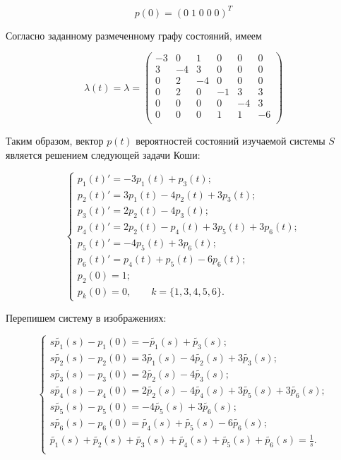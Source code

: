 \documentclass[14pt,a4paper]{scrartcl}
\begin{document}
\begin{equation}
	p(0) = (0 \; 1 \; 0 \; 0 \; 0)^T
\end{equation}

Согласно заданному размеченному графу состояний, имеем

\begin{equation*}
\lambda(t) = \lambda = 
\begin{pmatrix}
-3 & 0 & 1 & 0 & 0 & 0\\
3 & -4 & 3 & 0 & 0 & 0 \\
0 & 2 & -4 & 0 & 0 & 0 \\
0 & 2 & 0 & -1 & 3 & 3 \\
0 & 0 & 0 & 0 & -4 & 3 \\
0 & 0 & 0 & 1 & 1 & -6 \\
\end{pmatrix}
\end{equation*}


Таким образом, вектор $p(t)$ вероятностей состояний изучаемой системы $S$ является решением следующей задачи Коши:

\begin{equation*}
	\begin{cases}
		p_1(t)' = -3p_1(t) + p_3(t);\\
		p_2(t)' = 3p_1(t) - 4p_2(t) + 3p_3(t);\\
		p_3(t)' = 2p_2(t) - 4p_3(t);\\
		p_4(t)' = 2p_2(t) - p_4(t) + 3p_5(t) + 3p_6(t);\\
		p_5(t)' = - 4p_5(t)+ 3p_6(t);\\
		p_6(t)' = p_4(t) + p_5(t) - 6p_6(t);\\
		
		p_2(0) = 1;\\
		p_k(0) = 0, \qquad k = \{1,3,4,5,6\}.
	\end{cases}
\end{equation*}


Перепишем систему в изображениях:

\begin{equation*}
	\begin{cases}
		s\widetilde{p_1}(s) - p_1(0) = -\widetilde{p_1}(s) + \widetilde{p_3}(s);\\
		s\widetilde{p_2}(s) - p_2(0) = 3\widetilde{p_1}(s) - 4\widetilde{p_2}(s) + 3\widetilde{p_3}(s);\\
		s\widetilde{p_3}(s) - p_3(0) = 2\widetilde{p_2}(s) - 4\widetilde{p_3}(s);\\
		s\widetilde{p_4}(s) - p_4(0) = 2\widetilde{p_2}(s) - 4\widetilde{p_4}(s) + 3\widetilde{p_5}(s) + 3\widetilde{p_6}(s);\\
		s\widetilde{p_5}(s) - p_5(0) = -4\widetilde{p_5}(s) + 3\widetilde{p_6}(s);\\
		s\widetilde{p_6}(s) - p_6(0) = \widetilde{p_4}(s) + \widetilde{p_5}(s) - 6\widetilde{p_6}(s);\\
		
		\widetilde{p_1}(s) + \widetilde{p_2}(s) + \widetilde{p_3}(s) + \widetilde{p_4}(s) + \widetilde{p_5}(s) + \widetilde{p_6}(s) = \frac{1}{s}.\\
	\end{cases}
\end{equation*}
\end{document}
